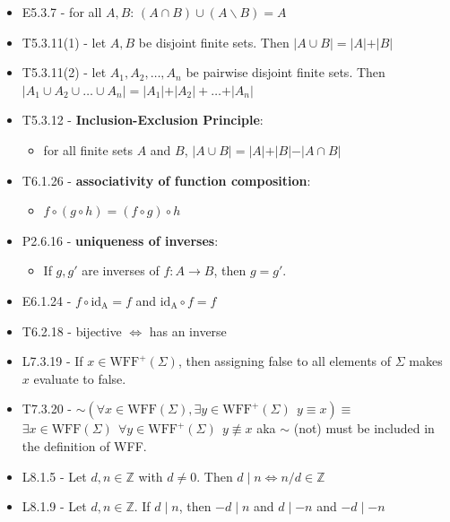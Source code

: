 \documentclass[10pt, landscape]{article}
\renewcommand{\lnot}{\mathord{\sim}}
\renewcommand{\bf}[1]{\textbf{#1}}
\let\Iff\Leftrightarrow
\begin{document}
\begin{multicols*}{3}
\begin{itemize}
        \item E5.3.7 - for all $A, B$: $(A \cap B) \cup (A \backslash B) = A$
        \item T5.3.11(1) - let $A, B$ be disjoint finite sets. Then $\vert A \cup B \vert = \vert A \vert + \vert B \vert$
        \item T5.3.11(2) - let $A_1, A_2, \dots, A_n$ be pairwise disjoint finite sets. Then $\vert A_1 \cup A_2 \cup \dots \cup A_n \vert = \vert A_1 \vert + \vert A_2 \vert + \dots + \vert A_n \vert$
        \item T5.3.12 - \bf{Inclusion-Exclusion Principle}: 
        \begin{itemize}
            \item for all finite sets $A$ and $B$, $\vert A \cup B \vert = \vert A \vert + \vert B \vert - \vert A \cap B \vert$
        \end{itemize} 
        \item T6.1.26 - \bf{associativity of function composition}: 
        \begin{itemize}
            \item $f\circ (g \circ h) = (f \circ g) \circ h$
        \end{itemize}
        \item P2.6.16 - \bf{uniqueness of inverses}: 
        \begin{itemize}
            \item If $g, g'$ are inverses of $f: A \to B$, then $g = g'$.
        \end{itemize} 
        \item E6.1.24 - $f \circ \text{id}_\text{A} = f$ and $\text{id}_\text{A} \circ f = f$
        \item T6.2.18 - bijective $\Iff$ has an inverse
        \item L7.3.19 - If $x \in \text{WFF}^+(\Sigma)$, then assigning false to all elements of $\Sigma$ makes $x$ evaluate to false.
        \item T7.3.20 - $\lnot( \forall x \in \text{WFF}(\Sigma), \exists y \in \text{WFF}^+(\Sigma) \ \ y \equiv x ) \equiv$
            $\exists x \in \text{WFF}(\Sigma) \ \ \forall y \in \text{WFF}^+(\Sigma) \ \ y \not\equiv x$
            aka $\lnot$ (not) must be included in the definition of WFF.
        \item L8.1.5 - Let $d, n \in \mathbb{Z}$ with $d \neq 0$. Then $d \mid n \Iff n/d \in \mathbb{Z}$ 
        \item L8.1.9 - Let $d, n \in \mathbb{Z}$. If $d \mid n$, then $-d \mid n$ and $d \mid -n$ and $-d \mid -n$ 

\end{itemize}
\end{multicols*}
\end{document}
